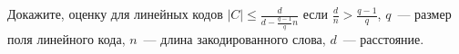 Докажите, оценку для линейных кодов $|C| \leq \frac{d}{d - \frac{q - 1}{q} n}$ если $\frac{d}{n} > \frac{q - 1}{q}$, $q$~---
размер поля линейного кода, $n$~--- длина закодированного слова, $d$~--- расстояние.